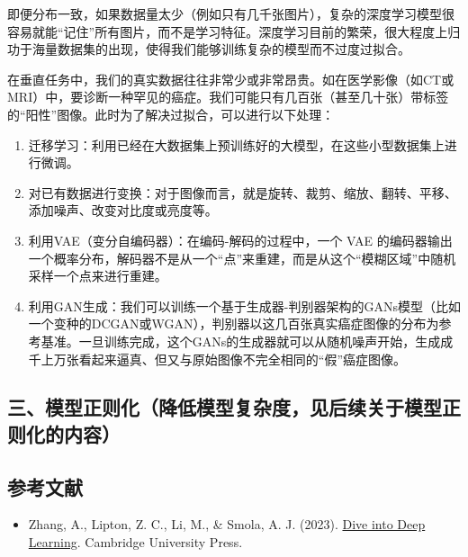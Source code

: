 即便分布一致，如果数据量太少（例如只有几千张图片），复杂的深度学习模型很容易就能``记住''所有图片，而不是学习特征。深度学习目前的繁荣，很大程度上归功于海量数据集的出现，使得我们能够训练复杂的模型而不过度过拟合。

在垂直任务中，我们的真实数据往往非常少或非常昂贵。如在医学影像（如CT或MRI）中，要诊断一种罕见的癌症。我们可能只有几百张（甚至几十张）带标签的``阳性''图像。此时为了解决过拟合，可以进行以下处理：

\begin{enumerate}
\def\labelenumi{\arabic{enumi}.}
\item
  迁移学习：利用已经在大数据集上预训练好的大模型，在这些小型数据集上进行微调。
\item
  对已有数据进行变换：对于图像而言，就是旋转、裁剪、缩放、翻转、平移、添加噪声、改变对比度或亮度等。
\item
  利用VAE（变分自编码器）：在编码-解码的过程中，一个 VAE 的编码器输出一个概率分布，解码器不是从一个``点''来重建，而是从这个``模糊区域''中随机采样一个点来进行重建。
\item
  利用GAN生成：我们可以训练一个基于生成器-判别器架构的GANs模型（比如一个变种的DCGAN或WGAN），判别器以这几百张真实癌症图像的分布为参考基准。一旦训练完成，这个GANs的生成器就可以从随机噪声开始，生成成千上万张看起来逼真、但又与原始图像不完全相同的``假''癌症图像。
\end{enumerate}

\hypertarget{ux4e09ux6a21ux578bux6b63ux5219ux5316ux964dux4f4eux6a21ux578bux590dux6742ux5ea6ux89c1ux540eux7eedux5173ux4e8eux6a21ux578bux6b63ux5219ux5316ux7684ux5185ux5bb9}{%
\subsection{三、模型正则化（降低模型复杂度，见后续关于模型正则化的内容）}\label{ux4e09ux6a21ux578bux6b63ux5219ux5316ux964dux4f4eux6a21ux578bux590dux6742ux5ea6ux89c1ux540eux7eedux5173ux4e8eux6a21ux578bux6b63ux5219ux5316ux7684ux5185ux5bb9}}

\hypertarget{ux53c2ux8003ux6587ux732e-3}{%
\subsection{参考文献}\label{ux53c2ux8003ux6587ux732e-3}}

\vspace{0.25em}
\begin{itemize}
\tightlist
\item
  Zhang, A., Lipton, Z. C., Li, M., \& Smola, A. J. (2023). \href{https://D2L.ai}{Dive into Deep Learning}. Cambridge University Press.
\end{itemize}

